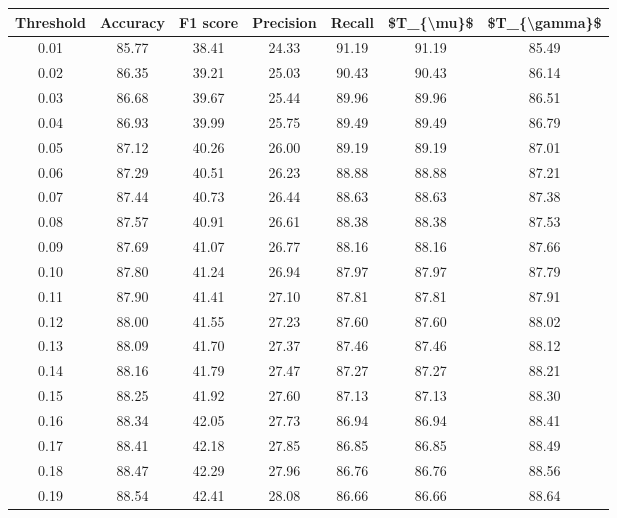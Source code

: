 \begin{tabular}{|c|c|c|c|c|c|c|}
\hline
 Threshold &  Accuracy &  F1 score &  Precision &  Recall &  \$T\_\{\textbackslash mu\}\$ &  \$T\_\{\textbackslash gamma\}\$ \\
\hline
      0.01 &     85.77 &     38.41 &      24.33 &   91.19 &      91.19 &         85.49 \\
      0.02 &     86.35 &     39.21 &      25.03 &   90.43 &      90.43 &         86.14 \\
      0.03 &     86.68 &     39.67 &      25.44 &   89.96 &      89.96 &         86.51 \\
      0.04 &     86.93 &     39.99 &      25.75 &   89.49 &      89.49 &         86.79 \\
      0.05 &     87.12 &     40.26 &      26.00 &   89.19 &      89.19 &         87.01 \\
      0.06 &     87.29 &     40.51 &      26.23 &   88.88 &      88.88 &         87.21 \\
      0.07 &     87.44 &     40.73 &      26.44 &   88.63 &      88.63 &         87.38 \\
      0.08 &     87.57 &     40.91 &      26.61 &   88.38 &      88.38 &         87.53 \\
      0.09 &     87.69 &     41.07 &      26.77 &   88.16 &      88.16 &         87.66 \\
      0.10 &     87.80 &     41.24 &      26.94 &   87.97 &      87.97 &         87.79 \\
      0.11 &     87.90 &     41.41 &      27.10 &   87.81 &      87.81 &         87.91 \\
      0.12 &     88.00 &     41.55 &      27.23 &   87.60 &      87.60 &         88.02 \\
      0.13 &     88.09 &     41.70 &      27.37 &   87.46 &      87.46 &         88.12 \\
      0.14 &     88.16 &     41.79 &      27.47 &   87.27 &      87.27 &         88.21 \\
      0.15 &     88.25 &     41.92 &      27.60 &   87.13 &      87.13 &         88.30 \\
      0.16 &     88.34 &     42.05 &      27.73 &   86.94 &      86.94 &         88.41 \\
      0.17 &     88.41 &     42.18 &      27.85 &   86.85 &      86.85 &         88.49 \\
      0.18 &     88.47 &     42.29 &      27.96 &   86.76 &      86.76 &         88.56 \\
      0.19 &     88.54 &     42.41 &      28.08 &   86.66 &      86.66 &         88.64 \\

\end{tabular}
